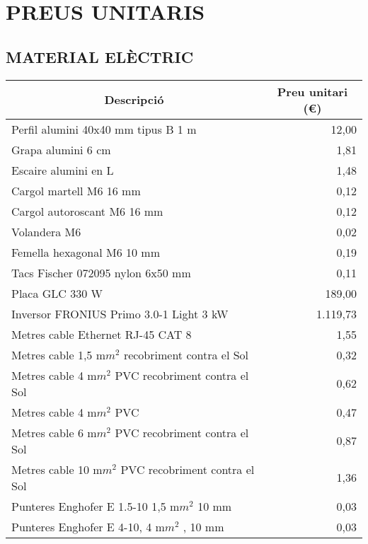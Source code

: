 \chapter{\uppercase{Preus unitaris}}

\section{\uppercase{Material elèctric}}
\begin{table}[H]
  \begin{center}
    \begin{tabularx} {\textwidth} {|X|r|} \hline
  \multicolumn{1}{|c|}{Descripció} &  \multicolumn{1}{c|}{Preu unitari (€)}\\ \hline \hline
    Perfil alumini 40x40 mm tipus B 1 m & 12,00 \\ \hline
    Grapa alumini 6 cm & 1,81 \\ \hline
    Escaire alumini en L & 1,48 \\ \hline
    Cargol martell M6 16 mm & 0,12 \\ \hline
    Cargol autoroscant M6 16 mm & 0,12 \\ \hline
    Volandera M6 & 0,02 \\ \hline
    Femella hexagonal M6 10 mm & 0,19 \\ \hline
    Tacs Fischer 072095 nylon 6x50 mm & 0,11 \\ \hline
%
%
    Placa GLC 330 W & 189,00 \\ \hline
    Inversor FRONIUS Primo 3.0-1 Light 3 kW & 1.119,73 \\ \hline
    Metres cable Ethernet RJ-45 CAT 8 & 1,55 \\ \hline
    Metres cable 1,5 m$m^2$   recobriment contra el Sol & 0,32 \\ \hline
    Metres cable 4 m$m^2$   PVC recobriment contra el Sol & 0,62 \\ \hline
    Metres cable 4 m$m^2$   PVC & 0,47 \\ \hline
    Metres cable 6 m$m^2$   PVC recobriment contra el Sol & 0,87 \\ \hline
    Metres cable 10 m$m^2$   PVC recobriment contra el Sol & 1,36 \\ \hline
    Punteres Enghofer E 1.5-10 1,5 m$m^2$   10 mm & 0,03 \\ \hline
    Punteres Enghofer E 4-10, 4 m$m^2$  , 10 mm & 0,03 \\ \hline

\end{tabularx}
\end{center}
\end{table}

